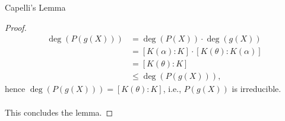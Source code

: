 \begin{appendixitem}{Capelli's Lemma}
\begin{proof}
        \begin{align*}
            \deg\left( P(g(X)) \right) &= \deg\left( P(X) \right) \cdot \deg\left( g(X) \right)\\&=\left[ K(\alpha) : K \right] \cdot\left[ K(\theta) : K(\alpha) \right]\\ &= \left[ K(\theta) : K \right]\\&\leq \deg\left( P(g(X)) \right),
        \end{align*}
        hence \( \deg\left( P\left(g\left(X\right)\right) \right) = \left[ K\left(\theta\right) : K \right] \), i.e., \( P\left(g\left(X\right)\right) \) is irreducible.
        \\\\
        This concludes the lemma.
    \end{proof}
\end{appendixitem}
